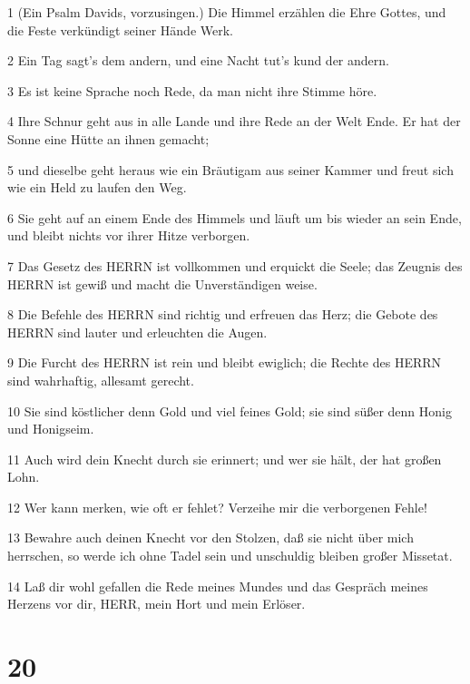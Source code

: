 \par 1 (Ein Psalm Davids, vorzusingen.) Die Himmel erzählen die Ehre Gottes, und die Feste verkündigt seiner Hände Werk.
\par 2 Ein Tag sagt's dem andern, und eine Nacht tut's kund der andern.
\par 3 Es ist keine Sprache noch Rede, da man nicht ihre Stimme höre.
\par 4 Ihre Schnur geht aus in alle Lande und ihre Rede an der Welt Ende. Er hat der Sonne eine Hütte an ihnen gemacht;
\par 5 und dieselbe geht heraus wie ein Bräutigam aus seiner Kammer und freut sich wie ein Held zu laufen den Weg.
\par 6 Sie geht auf an einem Ende des Himmels und läuft um bis wieder an sein Ende, und bleibt nichts vor ihrer Hitze verborgen.
\par 7 Das Gesetz des HERRN ist vollkommen und erquickt die Seele; das Zeugnis des HERRN ist gewiß und macht die Unverständigen weise.
\par 8 Die Befehle des HERRN sind richtig und erfreuen das Herz; die Gebote des HERRN sind lauter und erleuchten die Augen.
\par 9 Die Furcht des HERRN ist rein und bleibt ewiglich; die Rechte des HERRN sind wahrhaftig, allesamt gerecht.
\par 10 Sie sind köstlicher denn Gold und viel feines Gold; sie sind süßer denn Honig und Honigseim.
\par 11 Auch wird dein Knecht durch sie erinnert; und wer sie hält, der hat großen Lohn.
\par 12 Wer kann merken, wie oft er fehlet? Verzeihe mir die verborgenen Fehle!
\par 13 Bewahre auch deinen Knecht vor den Stolzen, daß sie nicht über mich herrschen, so werde ich ohne Tadel sein und unschuldig bleiben großer Missetat.
\par 14 Laß dir wohl gefallen die Rede meines Mundes und das Gespräch meines Herzens vor dir, HERR, mein Hort und mein Erlöser.

\chapter{20}

